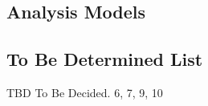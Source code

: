 \documentclass{article}
\newcommand{\comment}[1]{}
\begin{document}
\printglossary

\subsection{Analysis Models}
\comment{
Optionally, include any pertinent analysis models, such as data flow diagrams, class diagrams, state-transition diagrams, or entity-relationship diagrams.
	}
\subsection{To Be Determined List}
\comment{
Collect a numbered list of the \acrshort{tbd} (to be determined) references in the \acrshort{srs} so they can be tracked for closure.
	}
TBD To Be Decided. 6, 7, 9, 10
\end{document}
